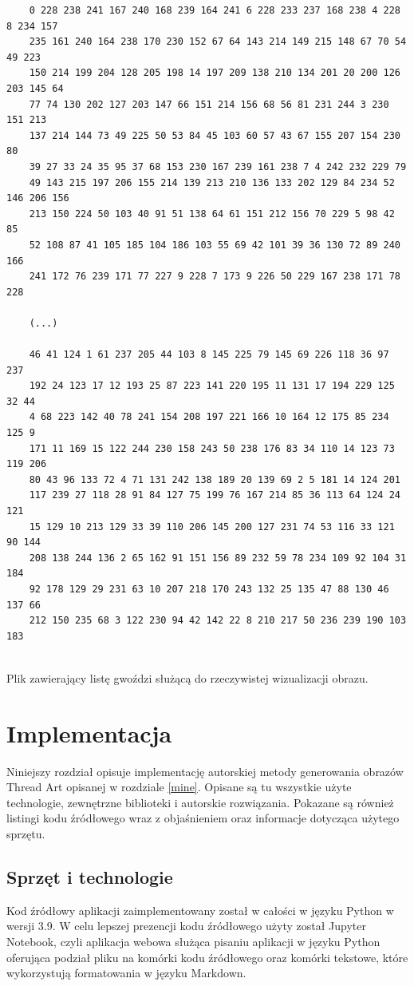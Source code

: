     \begin{code}[H]
    \begin{lstlisting}
    0 228 238 241 167 240 168 239 164 241 6 228 233 237 168 238 4 228 8 234 157 
    235 161 240 164 238 170 230 152 67 64 143 214 149 215 148 67 70 54 49 223 
    150 214 199 204 128 205 198 14 197 209 138 210 134 201 20 200 126 203 145 64 
    77 74 130 202 127 203 147 66 151 214 156 68 56 81 231 244 3 230 151 213 
    137 214 144 73 49 225 50 53 84 45 103 60 57 43 67 155 207 154 230 80 
    39 27 33 24 35 95 37 68 153 230 167 239 161 238 7 4 242 232 229 79 
    49 143 215 197 206 155 214 139 213 210 136 133 202 129 84 234 52 146 206 156 
    213 150 224 50 103 40 91 51 138 64 61 151 212 156 70 229 5 98 42 85 
    52 108 87 41 105 185 104 186 103 55 69 42 101 39 36 130 72 89 240 166 
    241 172 76 239 171 77 227 9 228 7 173 9 226 50 229 167 238 171 78 228 
    
    (...)
    
    46 41 124 1 61 237 205 44 103 8 145 225 79 145 69 226 118 36 97 237 
    192 24 123 17 12 193 25 87 223 141 220 195 11 131 17 194 229 125 32 44 
    4 68 223 142 40 78 241 154 208 197 221 166 10 164 12 175 85 234 125 9 
    171 11 169 15 122 244 230 158 243 50 238 176 83 34 110 14 123 73 119 206 
    80 43 96 133 72 4 71 131 242 138 189 20 139 69 2 5 181 14 124 201 
    117 239 27 118 28 91 84 127 75 199 76 167 214 85 36 113 64 124 24 121 
    15 129 10 213 129 33 39 110 206 145 200 127 231 74 53 116 33 121 90 144 
    208 138 244 136 2 65 162 91 151 156 89 232 59 78 234 109 92 104 31 184 
    92 178 129 29 231 63 10 207 218 170 243 132 25 135 47 88 130 46 137 66 
    212 150 235 68 3 122 230 94 42 142 22 8 210 217 50 236 239 190 103 183 
    
    \end{lstlisting}
    \caption{Plik zawierający listę gwoździ służącą do rzeczywistej wizualizacji obrazu.}
    \label{taco-wiz-txt}
    \end{code}
    
\chapter{Implementacja} \label{imp}
Niniejszy rozdział opisuje implementację autorskiej metody generowania obrazów Thread Art opisanej w rozdziale \ref{mine}. Opisane są tu wszystkie użyte technologie, zewnętrzne biblioteki i autorskie rozwiązania. Pokazane są również listingi kodu źródłowego wraz z objaśnieniem oraz informacje dotycząca użytego sprzętu.
    \section{Sprzęt i technologie} \label{imp-technologies}
    Kod źródłowy aplikacji zaimplementowany został w całości w języku Python w wersji 3.9. W celu lepszej prezencji kodu źródłowego użyty został Jupyter Notebook, czyli aplikacja webowa służąca pisaniu aplikacji w języku Python oferująca podział pliku na komórki kodu źródłowego oraz komórki tekstowe, które wykorzystują formatowania w języku Markdown.
    
